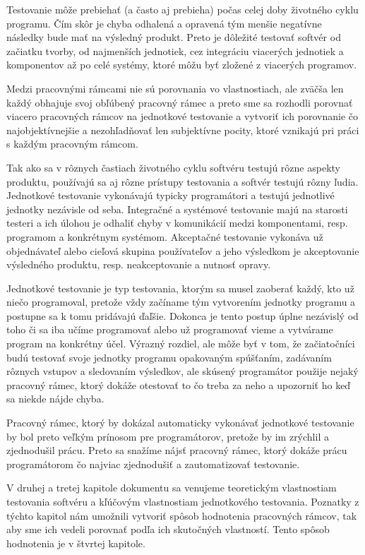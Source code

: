 \documentclass[11pt,twoside,slovak,a4paper]{article}
\begin{document}
	Testovanie môže prebiehať (a často aj prebieha) počas celej doby životného cyklu programu. Čím skôr je chyba odhalená a opravená tým menšie negatívne následky bude mať na výsledný produkt. Preto je dôležité testovať softvér od začiatku tvorby, od najmenších jednotiek, cez integráciu viacerých jednotiek a komponentov až po celé systémy, ktoré môžu byť zložené z viacerých programov.
	
	Medzi pracovnými rámcami nie sú porovnania vo vlastnostiach, ale zväčša len každý obhajuje svoj obľúbený pracovný rámec a preto sme sa rozhodli porovnať viacero pracovných rámcov na jednotkové testovanie a vytvoriť ich porovnanie čo najobjektívnejšie a nezohľadňovať len subjektívne pocity, ktoré vznikajú pri práci s každým pracovným rámcom.
		
	Tak ako sa v rôznych častiach životného cyklu softvéru testujú rôzne aspekty produktu, používajú sa aj rôzne prístupy testovania a softvér testujú rôzny ľudia. Jednotkové testovanie vykonávajú typicky programátori a testujú jednotlivé jednotky nezávisle od seba. Integračné a systémové testovanie majú na starosti testeri a ich úlohou je odhaliť chyby v komunikácií medzi komponentami, resp. programom a konkrétnym systémom. Akceptačné testovanie vykonáva už objednávateľ alebo cieľová skupina používateľov a jeho výsledkom je akceptovanie výsledného produktu, resp. neakceptovanie a nutnosť opravy\cite{Myers}.
	
	Jednotkové testovanie je typ testovania, ktorým sa musel zaoberať každý, kto už niečo programoval, pretože vždy začíname tým  vytvorením jednotky programu a postupne sa k tomu pridávajú ďaľšie. Dokonca je tento postup úplne nezávislý od toho či sa iba učíme programovať alebo už programovať vieme a vytvárame program na konkrétny účel. Výrazný rozdiel, ale môže byť v tom, že začiatočníci budú testovať svoje jednotky programu opakovaným spúšťaním, zadávaním rôznych vstupov a sledovaním výsledkov, ale skúsený programátor použije nejaký pracovný rámec, ktorý dokáže otestovať to čo treba za neho a upozorniť ho keď sa niekde nájde chyba.
	
	Pracovný rámec, ktorý by dokázal automaticky vykonávať jednotkové testovanie by bol preto veľkým prínosom pre programátorov, pretože by im zrýchlil a zjednodušil prácu. Preto sa snažíme nájsť pracovný rámec, ktorý dokáže prácu programátorom čo najviac zjednodušiť a zautomatizovať testovanie.
	
	V druhej a tretej kapitole dokumentu sa venujeme teoretickým vlastnostiam testovania softvéru a kľúčovým vlastnostiam jednotkového testovania. Poznatky z týchto kapitol nám umožnili vytvoriť spôsob hodnotenia pracovných rámcov, tak aby sme ich vedeli porovnať podľa ich skutočných vlastností. Tento spôsob hodnotenia je v štvrtej kapitole.
	
\end{document}
